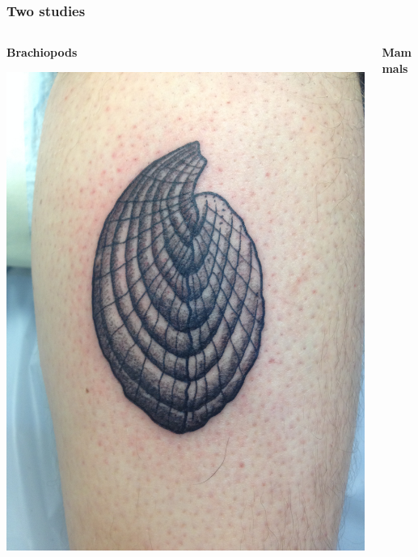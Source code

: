 \documentclass{beamer}
\begin{document}
\begin{frame}
  \frametitle{Two studies}
  \begin{columns}
    \begin{column}{0.5\textwidth}
      \begin{center}
        \textbf{Brachiopods}

        \vspace{0.5cm}

        \includegraphics[height = 0.4\textheight, keepaspectratio = true]{figure/tattoo}
      \end{center}
    \end{column}
    \begin{column}{0.5\textwidth}
      \begin{center}
        \textbf{Mammals}

        \vspace{0.5cm}


\end{center}
\end{column}
\end{columns}
\end{frame}
\end{document}
